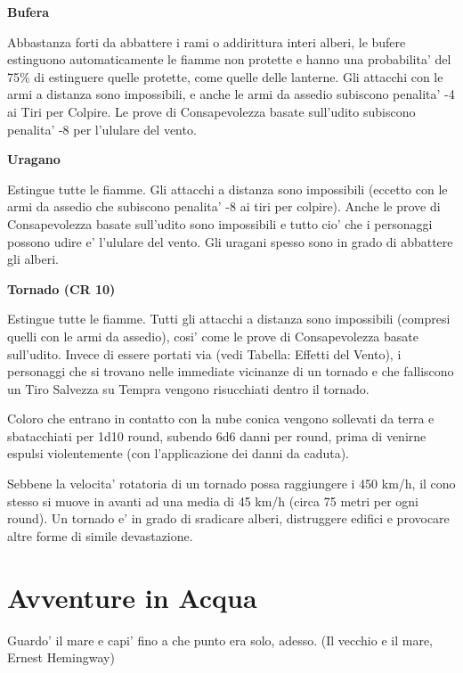 \documentclass[a4paper,11pt,twoside,openany]{dndbook}
\begin{document}
{\textbf{Bufera}

Abbastanza forti da abbattere i rami o addirittura interi alberi, le bufere estinguono automaticamente le fiamme non protette e hanno una probabilita' del 75\% di estinguere quelle protette, come quelle delle lanterne. Gli attacchi con le armi a distanza sono impossibili, e anche le armi da assedio subiscono penalita' -4 ai Tiri per Colpire. Le prove di Consapevolezza basate sull'udito subiscono penalita' -8 per l'ululare del vento.

\textbf{Uragano}

Estingue tutte le fiamme. Gli attacchi a distanza sono impossibili (eccetto con le armi da assedio che subiscono penalita' -8 ai tiri per colpire). Anche le prove di Consapevolezza basate sull'udito sono impossibili e tutto cio' che i personaggi possono udire e' l'ululare del vento. Gli uragani spesso sono in grado di abbattere gli alberi.

\textbf{Tornado (CR 10)}

Estingue tutte le fiamme. Tutti gli attacchi a distanza sono impossibili (compresi quelli con le armi da assedio), cosi' come le prove di Consapevolezza basate sull'udito. Invece di essere portati via (vedi Tabella: Effetti del Vento), i personaggi che si trovano nelle immediate vicinanze di un tornado e che falliscono un Tiro Salvezza su Tempra vengono risucchiati dentro il tornado.

Coloro che entrano in contatto con la nube conica vengono sollevati da terra e sbatacchiati per 1d10 round, subendo 6d6 danni per round, prima di venirne espulsi violentemente (con l'applicazione dei danni da caduta).

Sebbene la velocita' rotatoria di un tornado possa raggiungere i 450 km/h, il cono stesso si muove in avanti ad una media di 45 km/h (circa 75 metri per ogni round). Un tornado e' in grado di sradicare alberi, distruggere edifici e provocare altre forme di simile devastazione.

\pagebreak

\section{Avventure in Acqua}

\label{avventure-in-acqua}
\begin{quotebox}
Guardo' il mare e capi' fino a che punto era solo, adesso. (Il vecchio e il mare, Ernest Hemingway)
\end{quotebox}

}
\end{document}
